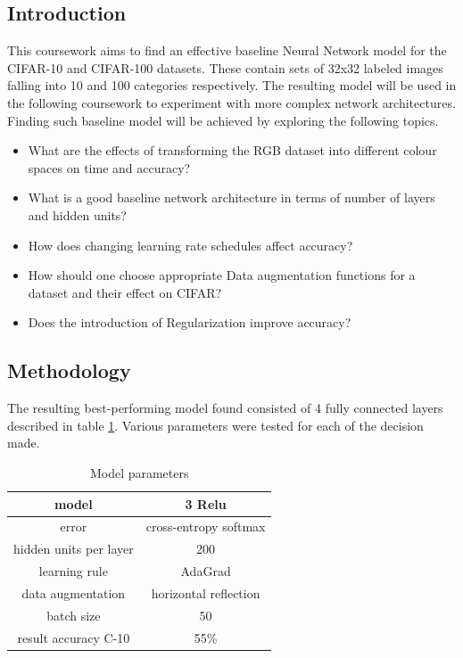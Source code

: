 \documentclass[12pt]{article}
\begin{document}
\maketitle


\subsection*{Introduction}
This coursework aims to find an effective baseline Neural Network model for the CIFAR-10 and CIFAR-100 datasets. These contain sets of 32x32 labeled images falling into 10 and 100 categories respectively. The resulting model will be used in the following coursework to experiment with more complex network architectures. Finding such baseline model will be achieved by exploring the following topics.
\begin{itemize}
\item What are the effects of transforming the RGB dataset into different colour spaces on time and accuracy?
\item What is a good baseline network architecture in terms of number of layers and hidden units?
\item How does changing learning rate schedules affect accuracy?
\item How should one choose appropriate Data augmentation functions for a dataset and their effect on CIFAR?
\item Does the introduction of Regularization improve accuracy?
\end{itemize}

\subsection*{Methodology}

The resulting best-performing model found consisted of 4 fully connected layers described in table \ref{tab:model}. Various parameters were tested for each of the decision made. 

\begin{table}[H]
\centering
\begin{tabular}[h]{| c | c |}
\hline
model & 3 Relu  \\
\hline
error & cross-entropy softmax   \\
\hline
hidden units per layer & 200   \\
\hline
learning rule & AdaGrad   \\
\hline 
data augmentation & horizontal reflection  \\
\hline
batch size & 50   \\
\hline
result accuracy C-10& 55\%   \\
\hline
\end{tabular} 
\caption{Model parameters}
\label{tab:model}
\end{table}
\end{document}
